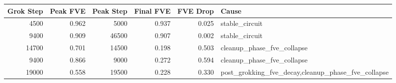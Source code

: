 \begin{adjustbox}{max width=\linewidth}
\begin{tabular}{rrrrr p{4cm}}
\toprule
Grok Step & Peak FVE & Peak Step & Final FVE & FVE Drop & Cause \\
\midrule
4500 & 0.962 & 5000 & 0.937 & 0.025 & stable\_\allowbreak circuit \\
9400 & 0.909 & 46500 & 0.907 & 0.002 & stable\_\allowbreak circuit \\
14700 & 0.701 & 14500 & 0.198 & 0.503 & cleanup\_\allowbreak phase\_\allowbreak fve\_\allowbreak collapse \\
9400 & 0.866 & 9000 & 0.272 & 0.594 & cleanup\_\allowbreak phase\_\allowbreak fve\_\allowbreak collapse \\
19000 & 0.558 & 19500 & 0.228 & 0.330 & post\_\allowbreak grokking\_\allowbreak fve\_\allowbreak decay,\allowbreak cleanup\_\allowbreak phase\_\allowbreak fve\_\allowbreak collapse \\
\bottomrule
\end{tabular}
\end{adjustbox}
